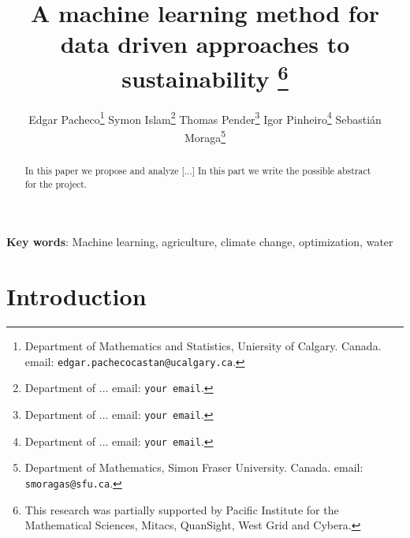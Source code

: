\documentclass[11pt]{article}
\title{A machine learning method for \\ data driven approaches to sustainability
\thanks{This research was 
partially supported by  Pacific Institute for the Mathematical Sciences, Mitacs, QuanSight, West Grid and Cybera.}}
\author{{\sc Edgar Pacheco}\thanks{Department of Mathematics and Statistics, Uniersity of Calgary. Canada.
email: {\tt edgar.pachecocastan@ucalgary.ca}.}
\quad
{\sc Symon Islam}\thanks{Department of ...
email: {\tt your email}.}
\quad
{\sc Thomas Pender}\thanks{Department of ...
email: {\tt your email}.}
\quad
{\sc Igor Pinheiro}\thanks{Department of ...
email: {\tt your email}.}
\quad
{\sc Sebasti\'an Moraga}\thanks{ Department of Mathematics, Simon Fraser University. Canada.
email: {\tt smoragas@sfu.ca}.}}
\date{ }
\numberwithin{equation}{section}
\numberwithin{figure}{section}
\begin{document}
\maketitle
{}
\begin{abstract}
\noindent
In this paper we propose and analyze [...] In this part we write the possible abstract for the project.

\end{abstract}

\noindent
{\bf Key words}: Machine learning, agriculture, climate change, optimization, water

\smallskip\noindent

                                                  

\section{Introduction}\label{section1}
\end{document}
